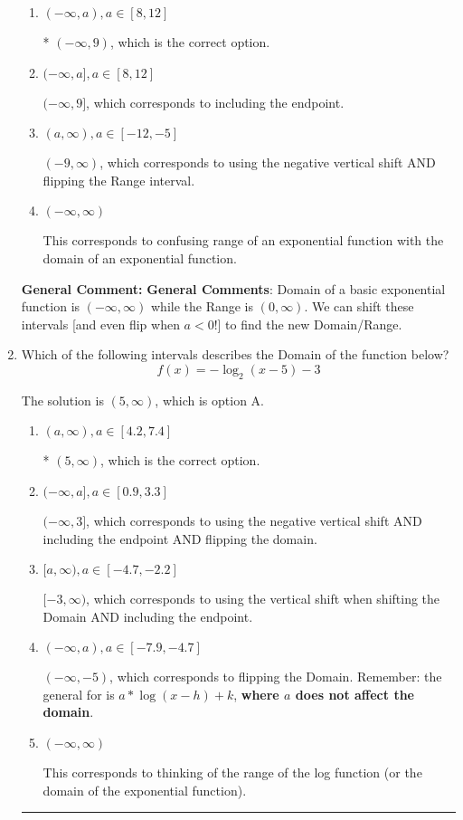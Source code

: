 \documentclass{extbook}[14pt]
\newcommand{\litem}[1]{\item #1

\rule{\textwidth}{0.4pt}}
\begin{document}
\begin{enumerate}
{\begin{enumerate}[label=\Alph*.]
$[-9, \infty)$, which corresponds to using the negative vertical shift AND flipping the Range interval AND including the endpoint.
\item \( (-\infty, a), a \in [8, 12] \)

* $(-\infty, 9)$, which is the correct option.
\item \( (-\infty, a], a \in [8, 12] \)

$(-\infty, 9]$, which corresponds to including the endpoint.
\item \( (a, \infty), a \in [-12, -5] \)

$(-9, \infty)$, which corresponds to using the negative vertical shift AND flipping the Range interval.
\item \( (-\infty, \infty) \)

This corresponds to confusing range of an exponential function with the domain of an exponential function.
\end{enumerate}

\textbf{General Comment:} \textbf{General Comments}: Domain of a basic exponential function is $(-\infty, \infty)$ while the Range is $(0, \infty)$. We can shift these intervals [and even flip when $a<0$!] to find the new Domain/Range.
}
\litem{
Which of the following intervals describes the Domain of the function below?
\[ f(x) = -\log_2{(x-5)}-3 \]

The solution is \( (5, \infty) \), which is option A.\begin{enumerate}[label=\Alph*.]
\item \( (a, \infty), a \in [4.2, 7.4] \)

* $(5, \infty)$, which is the correct option.
\item \( (-\infty, a], a \in [0.9, 3.3] \)

$(-\infty, 3]$, which corresponds to using the negative vertical shift AND including the endpoint AND flipping the domain.
\item \( [a, \infty), a \in [-4.7, -2.2] \)

$[-3, \infty)$, which corresponds to using the vertical shift when shifting the Domain AND including the endpoint.
\item \( (-\infty, a), a \in [-7.9, -4.7] \)

$(-\infty, -5)$, which corresponds to flipping the Domain. Remember: the general for is $a*\log(x-h)+k$, \textbf{where $a$ does not affect the domain}.
\item \( (-\infty, \infty) \)

This corresponds to thinking of the range of the log function (or the domain of the exponential function).
\end{enumerate}

}
\end{enumerate}
\end{document}
